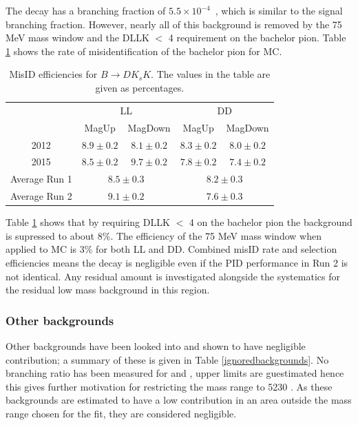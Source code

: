 The decay \decay{\B}{\D\KS\kaon} has a branching fraction of $5.5 \times 10^{-4}$~\cite{PDG2014}, which is similar to the signal branching fraction. However, nearly all of this background is removed by the 75 MeV \Kstarpm mass window and the DLLK $<$ 4 requirement on the bachelor pion. Table \ref{b2dkkspid} shows the rate of misidentification of the bachelor pion for \decay{\B}{\D\KS\kaon} MC.

\begin{table}[h]
\centering
\begin{tabular}{c|cc|cc}
\hline
& \multicolumn{2}{c}{LL} & \multicolumn{2}{c}{DD} \\
& MagUp & MagDown & MagUp & MagDown \\
\hline
2012 & $8.9 \pm 0.2$ & $8.1 \pm 0.2$ & $8.3 \pm 0.2$ & $8.0 \pm 0.2$ \\
2015 & $8.5 \pm 0.2$ & $9.7 \pm 0.2$ & $7.8 \pm 0.2$ & $7.4 \pm 0.2$ \\
\hline
Average Run 1 & \multicolumn{2}{c}{$8.5 \pm 0.3$} & \multicolumn{2}{c}{$8.2 \pm 0.3$} \\
Average Run 2 & \multicolumn{2}{c}{$9.1 \pm 0.2$} & \multicolumn{2}{c}{$7.6 \pm 0.3$} \\
\hline
\end{tabular}
\caption{MisID efficiencies for $B \to DK_sK$. The values in the table are given as percentages.}
\label{b2dkkspid}
\end{table}

Table \ref{b2dkkspid} shows that by requiring DLLK $<$ 4 on the bachelor pion the background is supressed to about 8\%. The efficiency of the 75 MeV \Kstarpm mass window when applied to \decay{\B}{\D\KS\kaon} MC is 3\% for both LL and DD. Combined misID rate and selection efficiencies means the decay is negligible even if the PID performance in Run 2 is not identical. Any residual amount is investigated alongside the systematics for the residual low mass background in this region.


\subsubsection{Other backgrounds}

Other backgrounds have been looked into and shown to have negligible contribution; a summary of these is given in Table \ref{ignoredbackgrounds}. No branching ratio has been measured for \decay{\Bm}{\Dz\Kstarm\piz} and \decay{\Bs}{\Dz\KS\pi\pi}, upper limits are guestimated hence this gives further motivation for restricting the mass range to 5230 \mevcc. As these backgrounds are estimated to have a low contribution in an area outside the mass range chosen for the \CP fit, they are considered negligible.

